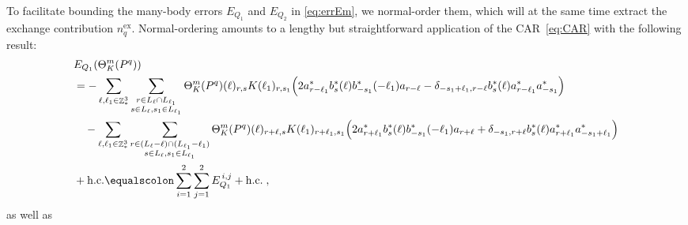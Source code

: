 \documentclass[12pt,a4paper]{article}
\numberwithin{equation}{section}
\newcommand{\1}{\mathbb{I}}
\newcommand{\ex}{\mathrm{ex}}
\DeclareMathOperator{\Z}{\mathbb{Z}}
\theoremstyle{plain}
\theoremstyle{definition}
\theoremstyle{remark}
\theoremstyle{plain}
\theoremstyle{definition}
\theoremstyle{remark}
\begin{document}
To facilitate bounding the many-body errors $ E_{Q_1} $ and $ E_{Q_2} $ in \eqref{eq:errEm}, we normal-order them, which will at the same time extract the exchange contribution $ n_q^{\ex} $. Normal-ordering amounts to a lengthy but straightforward application of the CAR~\eqref{eq:CAR} with the following result:
\begin{equation} \label{eq:EQ1_expansion}
\begin{aligned}
	&E_{Q_1}(\Theta^m_{K}(P^q)) \\
	&= -	\sum\limits_{\ell, \ell_1\in \Z^3_*}\sum\limits_{\substack{r\in L_{\ell} \cap L_{\ell_1}\\ s \in L_{\ell},s_1\in L_{\ell_1}}} \Theta^m_{K}(P^q)(\ell)_{r,s}K(\ell_1)_{r,s_1}
		\Big( 2a^*_{r-\ell_1}b^*_{s}(\ell) b^*_{-s_1}(-\ell_1)a_{r-\ell} 
		-\delta_{-s_1+\ell_1,r-\ell} b^*_{s}(\ell) a^*_{r-\ell_1}a^*_{-s_1} \Big) \\
	&\quad -\sum\limits_{\ell, \ell_1\in \Z^3_*}\sum\limits_{\substack{r\in (L_{\ell}-\ell) \cap (L_{\ell_1}-\ell_1)\\ s \in L_{\ell},s_1\in L_{\ell_1} }}
	\Theta^m_{K}(P^q)(\ell)_{r+\ell,s} K(\ell_1)_{r+\ell_1,s_1}
		\Big( 2a^*_{r+\ell_1}b^*_{s}(\ell) b^*_{-s_1}(-\ell_1) a_{r+\ell} 
		+ \delta_{-s_1,r+\ell} b^*_{s}(\ell) a^*_{r+\ell_1}a^*_{-s_1+\ell_1}\Big)\\
	&+ \mathrm{h.c.} \equalscolon \sum\limits_{i=1}^{2}\sum\limits_{j=1}^{2} E_{Q_1}^{\,i,j} + \mathrm{h.c.} \;,
\end{aligned}
\end{equation}
as well as
\end{document}

